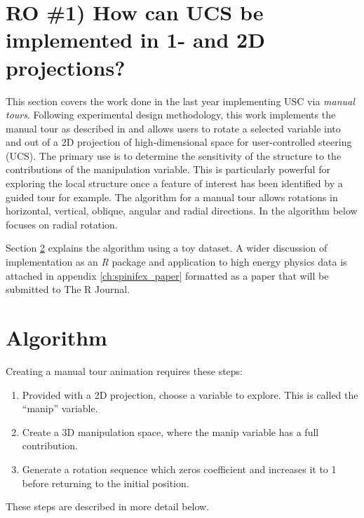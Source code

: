 \documentclass{monashthesis}
\begin{document}
\section{RO \#1) How can UCS be implemented in 1- and 2D
projections?}\label{ro-1-how-can-ucs-be-implemented-in-1--and-2d-projections}

This section covers the work done in the last year implementing USC via
\emph{manual tours}. Following experimental design methodology, this
work implements the manual tour as described in
\textcite{cook_manual_1997} and allows users to rotate a selected
variable into and out of a 2D projection of high-dimensional space for
user-controlled steering (UCS). The primary use is to determine the
sensitivity of the structure to the contributions of the manipulation
variable. This is particularly powerful for exploring the local
structure once a feature of interest has been identified by a guided
tour \autocite{cook_grand_1995} for example. The algorithm for a manual
tour allows rotations in horizontal, vertical, oblique, angular and
radial directions. In the algorithm below focuses on radial rotation.

Section \ref{sec:algorithm} explains the algorithm using a toy dataset.
A wider discussion of implementation as an \emph{R} package and
application to high energy physics data
\autocites{wang_visualizing_2018}{cook_dynamical_2018} is attached in
appendix \ref{ch:spinifex_paper} formatted as a paper that will be
submitted to The R Journal.

\section{Algorithm}\label{sec:algorithm}

Creating a manual tour animation requires these steps:

\begin{enumerate}
\def\labelenumi{\arabic{enumi}.}
\tightlist
\item
  Provided with a 2D projection, choose a variable to explore. This is
  called the ``manip'' variable.
\item
  Create a 3D manipulation space, where the manip variable has a full
  contribution.
\item
  Generate a rotation sequence which zeros coefficient and increases it
  to 1 before returning to the initial position.
\end{enumerate}

These steps are described in more detail below.
\end{document}

